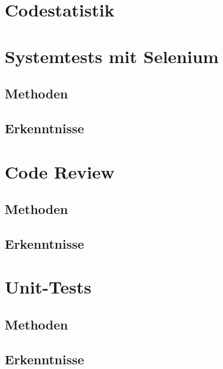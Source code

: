 

\section{Codestatistik}



\section{Systemtests mit Selenium}

\subsection{Methoden}

\subsection{Erkenntnisse}

\section{Code Review}

\subsection{Methoden}

\subsection{Erkenntnisse}

\section{Unit-Tests}

\subsection{Methoden}

\subsection{Erkenntnisse}



